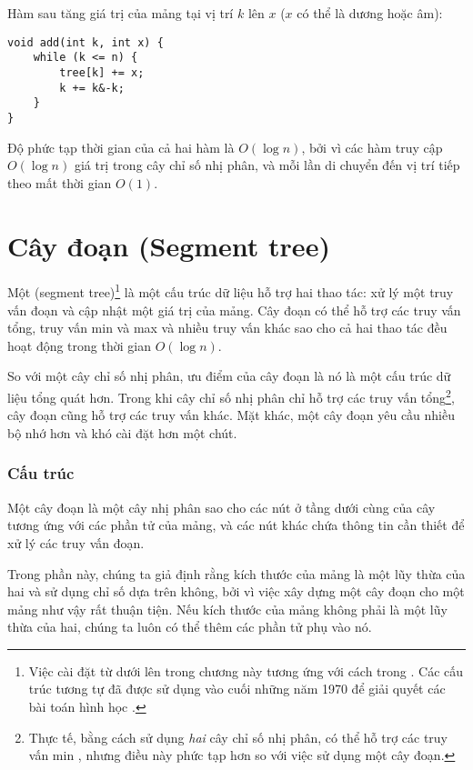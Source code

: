 Hàm sau tăng giá trị
của mảng tại vị trí $k$ lên $x$
($x$ có thể là dương hoặc âm):
\begin{lstlisting}
void add(int k, int x) {
    while (k <= n) {
        tree[k] += x;
        k += k&-k;
    }
}
\end{lstlisting}

Độ phức tạp thời gian của cả hai hàm là
$O(\log n)$, bởi vì các hàm truy cập $O(\log n)$
giá trị trong cây chỉ số nhị phân, và mỗi lần di chuyển
đến vị trí tiếp theo mất thời gian $O(1)$.

\section{Cây đoạn (Segment tree)}


Một  (segment tree)\footnote{Việc cài đặt từ dưới lên trong chương này tương ứng với
cách trong \cite{sta06}. Các cấu trúc tương tự đã được sử dụng
vào cuối những năm 1970 để giải quyết các bài toán hình học \cite{ben80}.} là một cấu trúc dữ liệu
hỗ trợ hai thao tác:
xử lý một truy vấn đoạn và
cập nhật một giá trị của mảng.
Cây đoạn có thể hỗ trợ
các truy vấn tổng, truy vấn min và max và nhiều
truy vấn khác sao cho cả hai thao tác đều hoạt động trong thời gian $O(\log n)$.

So với một cây chỉ số nhị phân,
ưu điểm của cây đoạn là nó là
một cấu trúc dữ liệu tổng quát hơn.
Trong khi cây chỉ số nhị phân chỉ hỗ trợ
các truy vấn tổng\footnote{Thực tế, bằng cách sử dụng \emph{hai} cây
chỉ số nhị phân, có thể hỗ trợ các truy vấn min \cite{dim15},
nhưng điều này phức tạp hơn so với việc sử dụng một cây đoạn.},
cây đoạn cũng hỗ trợ các truy vấn khác.
Mặt khác, một cây đoạn yêu cầu nhiều
bộ nhớ hơn và khó cài đặt hơn một chút.

\subsubsection{Cấu trúc}

Một cây đoạn là một cây nhị phân
sao cho các nút ở tầng dưới cùng của cây
tương ứng với các phần tử của mảng,
và các nút khác
chứa thông tin cần thiết để xử lý các truy vấn đoạn.

Trong phần này, chúng ta giả định rằng kích thước
của mảng là một lũy thừa của hai và sử dụng
chỉ số dựa trên không, bởi vì việc xây dựng
một cây đoạn cho một mảng như vậy rất thuận tiện.
Nếu kích thước của mảng không phải là một lũy thừa của hai,
chúng ta luôn có thể thêm các phần tử phụ vào nó.

